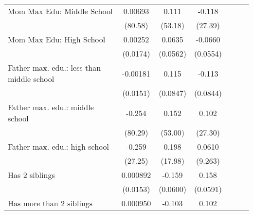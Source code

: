 {\begin{tabular}{l*{6}{c}}
\addlinespace
Mom Max Edu: Middle School&     0.00693         &       0.111         &      -0.118         &                     &                     &                     \\
                    &     (80.58)         &     (53.18)         &     (27.39)         &                     &                     &                     \\
\addlinespace
Mom Max Edu: High School&     0.00252         &      0.0635         &     -0.0660         &                     &                     &                     \\
                    &    (0.0174)         &    (0.0562)         &    (0.0554)         &                     &                     &                     \\
\addlinespace
Father max. edu.: less than middle school&    -0.00181         &       0.115         &      -0.113         &                     &                     &                     \\
                    &    (0.0151)         &    (0.0847)         &    (0.0844)         &                     &                     &                     \\
\addlinespace
Father max. edu.: middle school&      -0.254         &       0.152         &       0.102         &                     &                     &                     \\
                    &     (80.29)         &     (53.00)         &     (27.30)         &                     &                     &                     \\
\addlinespace
Father max. edu.: high school&      -0.259         &       0.198         &      0.0610         &                     &                     &                     \\
                    &     (27.25)         &     (17.98)         &     (9.263)         &                     &                     &                     \\
\addlinespace
Has 2 siblings      &    0.000892         &      -0.159\sym{**} &       0.158\sym{**} &                     &                     &                     \\
                    &    (0.0153)         &    (0.0600)         &    (0.0591)         &                     &                     &                     \\
\addlinespace
Has more than 2 siblings&    0.000950         &      -0.103         &       0.102         &                     &                     &                     \\

\end{tabular}}
